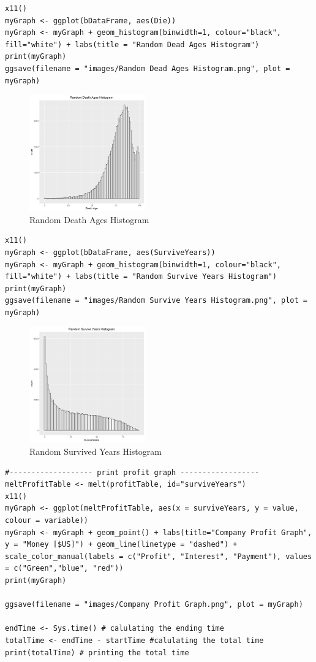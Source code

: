 \documentclass[12pt]{article}
\begin{document}
\begin{lstlisting}[caption={Random Death Ages Histogram},captionpos=b]
x11()
myGraph <- ggplot(bDataFrame, aes(Die))
myGraph <- myGraph + geom_histogram(binwidth=1, colour="black", fill="white") + labs(title = "Random Dead Ages Histogram")
print(myGraph)
ggsave(filename = "images/Random Dead Ages Histogram.png", plot = myGraph)
\end{lstlisting}
\begin{figure}[h]
	\centering
	\includegraphics[width=0.5\linewidth, height=5cm]{S5.png}
	\caption{Random Death Ages Histogram}
	
\end{figure}
\pagebreak
\begin{lstlisting}[caption={Random Survived Years Histogram},captionpos=b]
x11()
myGraph <- ggplot(bDataFrame, aes(SurviveYears))
myGraph <- myGraph + geom_histogram(binwidth=1, colour="black", fill="white") + labs(title = "Random Survive Years Histogram")
print(myGraph)
ggsave(filename = "images/Random Survive Years Histogram.png", plot = myGraph)
\end{lstlisting}
\begin{figure}[h]
	\centering
	\includegraphics[width=0.5\linewidth, height=5cm]{S6.png}
	\caption{Random Survived Years Histogram}

\end{figure}
\pagebreak
\begin{lstlisting}[caption={Company Profit Graph},captionpos=b]
#------------------- print profit graph ------------------
meltProfitTable <- melt(profitTable, id="surviveYears")
x11()
myGraph <- ggplot(meltProfitTable, aes(x = surviveYears, y = value, colour = variable))
myGraph <- myGraph + geom_point() + labs(title="Company Profit Graph", y = "Money [$US]") + geom_line(linetype = "dashed") +
scale_color_manual(labels = c("Profit", "Interest", "Payment"), values = c("Green","blue", "red")) 
print(myGraph)

ggsave(filename = "images/Company Profit Graph.png", plot = myGraph)

endTime <- Sys.time() # calulating the ending time
totalTime <- endTime - startTime #calulating the total time
print(totalTime) # printing the total time
\end{lstlisting}
\end{document}
